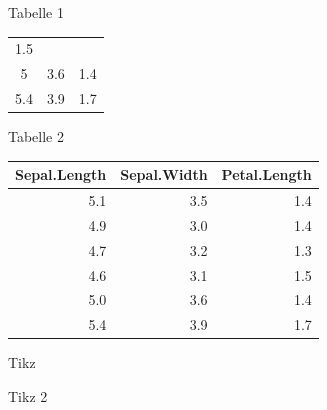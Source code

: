 \begin{frame}{Tabelle 1}
\begin{longtable}[c]{@{}ccc@{}}
\begin{minipage}[t]{0.18\columnwidth}
1.5
\strut\end{minipage}\tabularnewline
\begin{minipage}[t]{0.19\columnwidth}\centering\strut
5
\strut\end{minipage} &
\begin{minipage}[t]{0.18\columnwidth}\centering\strut
3.6
\strut\end{minipage} &
\begin{minipage}[t]{0.18\columnwidth}\centering\strut
1.4
\strut\end{minipage}\tabularnewline
\begin{minipage}[t]{0.19\columnwidth}\centering\strut
5.4
\strut\end{minipage} &
\begin{minipage}[t]{0.18\columnwidth}\centering\strut
3.9
\strut\end{minipage} &
\begin{minipage}[t]{0.18\columnwidth}\centering\strut
1.7
\strut\end{minipage}\tabularnewline
\bottomrule
\end{longtable}

\end{frame}

\begin{frame}{Tabelle 2}

\begin{longtable}[c]{@{}rrr@{}}
\toprule
Sepal.Length & Sepal.Width & Petal.Length\tabularnewline
\midrule
\endhead
5.1 & 3.5 & 1.4\tabularnewline
4.9 & 3.0 & 1.4\tabularnewline
4.7 & 3.2 & 1.3\tabularnewline
4.6 & 3.1 & 1.5\tabularnewline
5.0 & 3.6 & 1.4\tabularnewline
5.4 & 3.9 & 1.7\tabularnewline
\bottomrule
\end{longtable}

\end{frame}

\begin{frame}{Tikz}


\end{frame}

\begin{frame}{Tikz 2}


\end{frame}

